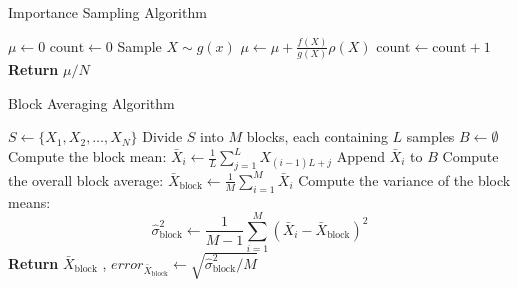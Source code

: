   \begin{algorithm}
    \caption{Importance Sampling Algorithm}
    \begin{algorithmic}[1]
    \State \( \mu \leftarrow 0 \) 
    \State \( \text{count} \leftarrow 0 \)
        \State Sample \( X \sim g(x) \) 
        \State \( \mu \leftarrow \mu + \frac{f(X)}{g(X)}\rho(X) \)
        \State \( \text{count} \leftarrow \text{count} + 1 \)
    \EndWhile
    \State \textbf{Return} \( \mu / N \) 
    \end{algorithmic}
    \label{importance_sampling}
\end{algorithm}

\begin{algorithm}
    \caption{Block Averaging Algorithm}
    \begin{algorithmic}[1]
    \State \( S \leftarrow \{X_1, X_2, \dots, X_N\} \) 
    \State Divide \( S \) into \( M \) blocks, each containing \( L \) samples 
    \State \( B \leftarrow \emptyset \) 
        \State Compute the block mean: \( \bar{X}_i \leftarrow \frac{1}{L} \sum_{j=1}^{L} X_{(i-1)L + j} \)
        \State Append \( \bar{X}_i \) to \( B \)
    \EndFor
    \State Compute the overall block average: \( \bar{X}_{\text{block}} \leftarrow \frac{1}{M} \sum_{i=1}^{M} \bar{X}_i \)
    \State Compute the variance of the block means:
    \[
    \hat{\sigma}^2_{\text{block}} \leftarrow \frac{1}{M-1} \sum_{i=1}^{M} (\bar{X}_i - \bar{X}_{\text{block}})^2
    \]
    \State \textbf{Return} \( \bar{X}_{\text{block}} \) , \( error_{\bar{X}_{\text{block}}} \leftarrow  \sqrt{\hat{\sigma}^2_{\text{block}} / M } \)
    \end{algorithmic}
    \label{block_averaging}
\end{algorithm}